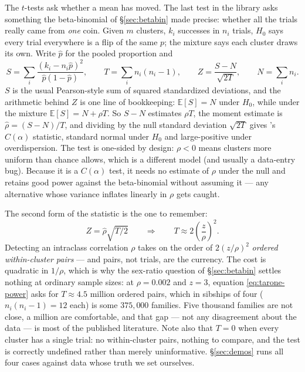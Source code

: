 \documentclass[11pt]{article}
\numberwithin{equation}{section}
\newcommand{\E}{\mathbb{E}}
\begin{document}
The $t$-tests ask whether a mean has moved.  The last test in the library
asks something the beta-binomial of \S\ref{sec:betabin} made precise:
whether all the trials really came from \emph{one} coin.  Given $m$
clusters, $k_i$ successes in $n_i$ trials, $H_0$ says every trial
everywhere is a flip of the same $p$; the mixture says each cluster draws
its own.  Write $\hat p$ for the pooled proportion and
\begin{equation}\label{eq:tarone}
S=\sum_i \frac{(k_i-n_i\hat p)^2}{\hat p(1-\hat p)},\qquad
T=\sum_i n_i(n_i-1),\qquad
Z=\frac{S-N}{\sqrt{2T}},\qquad N=\sum_i n_i .
\end{equation}
$S$ is the usual Pearson-style sum of squared standardized deviations,
and the arithmetic behind $Z$ is one line of bookkeeping:
$\E[S]=N$ under $H_0$, while under the mixture $\E[S]=N+\rho T$.  So
$S-N$ estimates $\rho T$, the moment estimate is
$\hat\rho=(S-N)/T$, and dividing by the null standard deviation
$\sqrt{2T}$ gives \citet{tarone1979}'s $C(\alpha)$ statistic, standard
normal under $H_0$ and large-positive under overdispersion.  The test is
one-sided by design: $\rho<0$ means clusters more uniform than chance
allows, which is a different model (and usually a data-entry bug).
Because it is a $C(\alpha)$ test, it needs no estimate of $\rho$ under
the null and retains good power against the beta-binomial without
assuming it --- any alternative whose variance inflates linearly in
$\rho$ gets caught.

The second form of the statistic is the one to remember:
\begin{equation}\label{eq:tarone-power}
Z=\hat\rho\sqrt{T/2}
\qquad\Longrightarrow\qquad
T \approx 2\left(\frac{z}{\rho}\right)^{2}.
\end{equation}
Detecting an intraclass correlation $\rho$ takes on the order of
$2(z/\rho)^2$ \emph{ordered within-cluster pairs} --- and pairs, not
trials, are the currency.  The cost is quadratic in $1/\rho$, which is
why the sex-ratio question of \S\ref{sec:betabin} settles nothing at
ordinary sample sizes: at $\rho=0.002$ and $z=3$, equation
\eqref{eq:tarone-power} asks for $T\approx4.5$ million ordered pairs,
which in sibships of four ($n_i(n_i-1)=12$ each) is some $375{,}000$
families.  Five thousand families are not close, a million are
comfortable, and that gap --- not any disagreement about the data --- is
most of the published literature.  Note also that $T=0$ when every
cluster has a single trial: no within-cluster pairs, nothing to compare,
and the test is correctly undefined rather than merely uninformative.
\S\ref{sec:demos} runs all four cases against data whose truth we set
ourselves.
\end{document}
